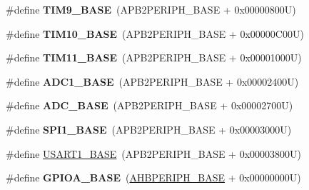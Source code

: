 \begin{DoxyCompactItemize}
\item 
\hypertarget{group___peripheral__memory__map_ga92ae902be7902560939223dd765ece08}{\#define {\bfseries T\-I\-M9\-\_\-\-B\-A\-S\-E}~(A\-P\-B2\-P\-E\-R\-I\-P\-H\-\_\-\-B\-A\-S\-E + 0x00000800\-U)}\label{group___peripheral__memory__map_ga92ae902be7902560939223dd765ece08}

\item 
\hypertarget{group___peripheral__memory__map_ga3eff32f3801db31fb4b61d5618cad54a}{\#define {\bfseries T\-I\-M10\-\_\-\-B\-A\-S\-E}~(A\-P\-B2\-P\-E\-R\-I\-P\-H\-\_\-\-B\-A\-S\-E + 0x00000\-C00\-U)}\label{group___peripheral__memory__map_ga3eff32f3801db31fb4b61d5618cad54a}

\item 
\hypertarget{group___peripheral__memory__map_ga3a4a06bb84c703084f0509e105ffaf1d}{\#define {\bfseries T\-I\-M11\-\_\-\-B\-A\-S\-E}~(A\-P\-B2\-P\-E\-R\-I\-P\-H\-\_\-\-B\-A\-S\-E + 0x00001000\-U)}\label{group___peripheral__memory__map_ga3a4a06bb84c703084f0509e105ffaf1d}

\item 
\hypertarget{group___peripheral__memory__map_ga695c9a2f892363a1c942405c8d351b91}{\#define {\bfseries A\-D\-C1\-\_\-\-B\-A\-S\-E}~(A\-P\-B2\-P\-E\-R\-I\-P\-H\-\_\-\-B\-A\-S\-E + 0x00002400\-U)}\label{group___peripheral__memory__map_ga695c9a2f892363a1c942405c8d351b91}

\item 
\hypertarget{group___peripheral__memory__map_gad06cb9e5985bd216a376f26f22303cd6}{\#define {\bfseries A\-D\-C\-\_\-\-B\-A\-S\-E}~(A\-P\-B2\-P\-E\-R\-I\-P\-H\-\_\-\-B\-A\-S\-E + 0x00002700\-U)}\label{group___peripheral__memory__map_gad06cb9e5985bd216a376f26f22303cd6}

\item 
\hypertarget{group___peripheral__memory__map_ga50cd8b47929f18b05efbd0f41253bf8d}{\#define {\bfseries S\-P\-I1\-\_\-\-B\-A\-S\-E}~(A\-P\-B2\-P\-E\-R\-I\-P\-H\-\_\-\-B\-A\-S\-E + 0x00003000\-U)}\label{group___peripheral__memory__map_ga50cd8b47929f18b05efbd0f41253bf8d}

\item 
\#define \hyperlink{group___peripheral__memory__map_ga86162ab3f740db9026c1320d46938b4d}{U\-S\-A\-R\-T1\-\_\-\-B\-A\-S\-E}~(A\-P\-B2\-P\-E\-R\-I\-P\-H\-\_\-\-B\-A\-S\-E + 0x00003800\-U)
\item 
\hypertarget{group___peripheral__memory__map_gad7723846cc5db8e43a44d78cf21f6efa}{\#define {\bfseries G\-P\-I\-O\-A\-\_\-\-B\-A\-S\-E}~(\hyperlink{group___peripheral__memory__map_ga92eb5d49730765d2abd0f5b09548f9f5}{A\-H\-B\-P\-E\-R\-I\-P\-H\-\_\-\-B\-A\-S\-E} + 0x00000000\-U)}\label{group___peripheral__memory__map_gad7723846cc5db8e43a44d78cf21f6efa}


\end{DoxyCompactItemize}
